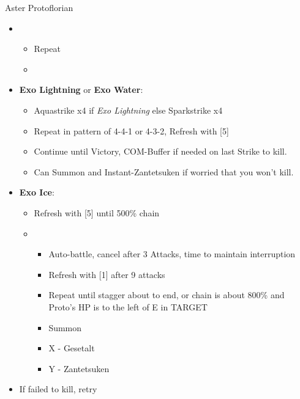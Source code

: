 \begin{battle}{Aster Protoflorian}
\begin{multicols}{2}
\begin{itemize}
      \item \fourth
            \begin{itemize}
              \item Repeat
              \item \stagger
            \end{itemize}
      \item \textbf{Exo Lightning} or \textbf{Exo Water}:
            \begin{itemize}
              \item Aquastrike x4 if \textit{Exo Lightning} else Sparkstrike x4
              \item Repeat in pattern of 4-4-1 or 4-3-2, Refresh with [5]
              \item Continue until Victory, COM-Buffer if needed on last Strike to kill.
              \item Can Summon and Instant-Zantetsuken if worried that you won't kill.
            \end{itemize}
      \item \textbf{Exo Ice}:
            \begin{itemize}
              \item Refresh with [5] until 500\% chain
              \item \sixth
                    \begin{itemize}
                      \item Auto-battle, cancel after 3 Attacks, time to maintain interruption
                      \item Refresh with [1] after 9 attacks
                      \item Repeat until stagger about to end, or chain is about 800\% and Proto's HP is to the left of E in TARGET
                      \item Summon
                      \item X - Gesetalt
                      \item Y - Zantetsuken
                    \end{itemize}
            \end{itemize}
      \item If failed to kill, retry
    \end{itemize}
  \end{multicols}
\end{battle}
